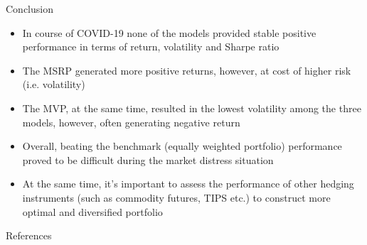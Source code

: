 \documentclass{beamer}
\begin{document}
\begin{frame}{Conclusion}
    \begin{itemize}
        \item In course of COVID-19 none of the models provided stable positive performance in terms of return, volatility and Sharpe ratio
        \item The MSRP generated more positive returns, however, at cost of higher risk (i.e. volatility)
        \item  The MVP, at the same time, resulted in the lowest volatility among the three models, however, often generating negative return
        \item Overall, beating the benchmark (equally weighted portfolio) performance proved to be difficult during the market distress situation
        \item At the same time, it's important to assess the performance of other hedging instruments (such as commodity futures, TIPS etc.) to construct more optimal and diversified portfolio
    \end{itemize}
\end{frame}

\begin{frame}{References}
\printbibliography
\end{frame}
\end{document}
